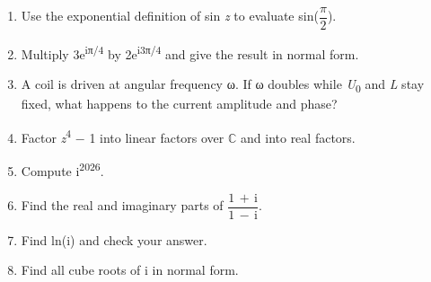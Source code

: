 \documentclass[11pt]{article}
\begin{document}
\begin{keepsection}
\begin{enumerate}
\item Use the exponential definition of sin \textit{z} to evaluate sin({\small\ensuremath{\dfrac{π}{2}}}).
\item Multiply 3e\textsuperscript{iπ/4} by 2e\textsuperscript{i3π/4} and give the result in normal form.
\item A coil is driven at angular frequency ω. If ω doubles while \textit{U}\textsubscript{0} and \textit{L} stay fixed, what happens to the current amplitude and phase?
\item Factor \textit{z}\textsuperscript{4} \ensuremath{-} 1 into linear factors over \ensuremath{\mathbb{C}} and into real factors.
\item Compute i\textsuperscript{2026}.
\item Find the real and imaginary parts of {\small\ensuremath{\dfrac{1\, +\, \mathrm{i}}{1\, -\, \mathrm{i}}}}.
\item Find ln(i) and check your answer.
\item Find all cube roots of i in normal form.
\end{enumerate}

\end{keepsection}
\end{document}
